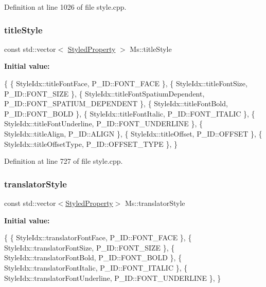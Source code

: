 Definition at line 1026 of file style.\+cpp.

\mbox{\label{namespace_ms_afa395c3bb5566ca46676a5e1094eb465}} 
\subsubsection{\texorpdfstring{title\+Style}{titleStyle}}
{\footnotesize\ttfamily const std\+::vector$<$ \hyperlink{struct_ms_1_1_styled_property}{Styled\+Property} $>$ Ms\+::title\+Style}

{\bfseries Initial value\+:}
\begin{DoxyCode}
\{
      \{ StyleIdx::titleFontFace,                      P\_ID::FONT\_FACE              \},
      \{ StyleIdx::titleFontSize,                      P\_ID::FONT\_SIZE              \},
      \{ StyleIdx::titleFontSpatiumDependent,          P\_ID::FONT\_SPATIUM\_DEPENDENT \},
      \{ StyleIdx::titleFontBold,                      P\_ID::FONT\_BOLD              \},
      \{ StyleIdx::titleFontItalic,                    P\_ID::FONT\_ITALIC            \},
      \{ StyleIdx::titleFontUnderline,                 P\_ID::FONT\_UNDERLINE         \},
      \{ StyleIdx::titleAlign,                         P\_ID::ALIGN                  \},
      \{ StyleIdx::titleOffset,                        P\_ID::OFFSET                 \},
      \{ StyleIdx::titleOffsetType,                    P\_ID::OFFSET\_TYPE            \},
      \}
\end{DoxyCode}


Definition at line 727 of file style.\+cpp.

\mbox{\label{namespace_ms_adb2b92dfb7e48333d58e2439931ed760}} 
\subsubsection{\texorpdfstring{translator\+Style}{translatorStyle}}
{\footnotesize\ttfamily const std\+::vector$<$\hyperlink{struct_ms_1_1_styled_property}{Styled\+Property}$>$ Ms\+::translator\+Style}

{\bfseries Initial value\+:}
\begin{DoxyCode}
\{
      \{ StyleIdx::translatorFontFace,                 P\_ID::FONT\_FACE              \},
      \{ StyleIdx::translatorFontSize,                 P\_ID::FONT\_SIZE              \},
      \{ StyleIdx::translatorFontBold,                 P\_ID::FONT\_BOLD              \},
      \{ StyleIdx::translatorFontItalic,               P\_ID::FONT\_ITALIC            \},
      \{ StyleIdx::translatorFontUnderline,            P\_ID::FONT\_UNDERLINE         \},
      \}
\end{DoxyCode}


